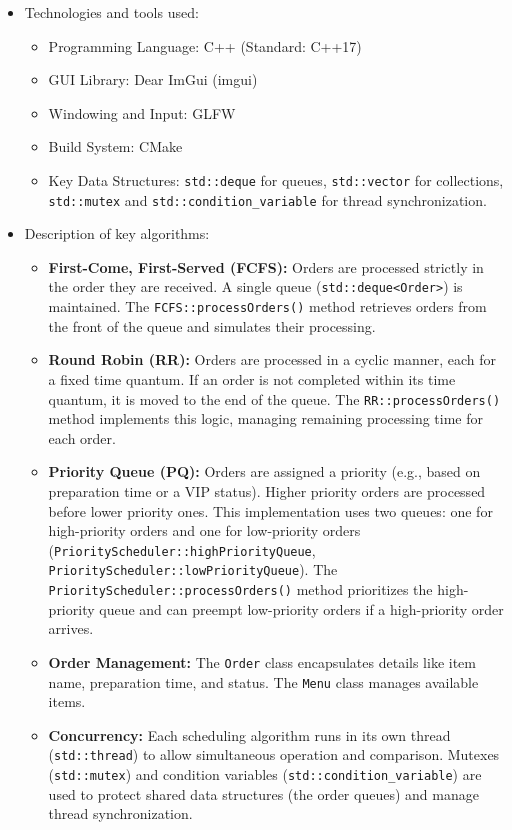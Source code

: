 \documentclass[a4paper,12pt]{article}
\begin{document}
\begin{itemize}
\begin{itemize}
        \end{itemize}
    \item Technologies and tools used:
        \begin{itemize}
            \item Programming Language: C++ (Standard: C++17)
            \item GUI Library: Dear ImGui (imgui)
            \item Windowing and Input: GLFW
            \item Build System: CMake
            \item Key Data Structures: \nolinkurl{std::deque} for queues, \nolinkurl{std::vector} for collections, \nolinkurl{std::mutex} and \nolinkurl{std::condition_variable} for thread synchronization.
        \end{itemize}
    \item Description of key algorithms:
        \begin{itemize}
            \item \textbf{First-Come, First-Served (FCFS):} Orders are processed strictly in the order they are received. A single queue (\nolinkurl{std::deque<Order>}) is maintained. The \nolinkurl{FCFS::processOrders()} method retrieves orders from the front of the queue and simulates their processing.
            \item \textbf{Round Robin (RR):} Orders are processed in a cyclic manner, each for a fixed time quantum. If an order is not completed within its time quantum, it is moved to the end of the queue. The \nolinkurl{RR::processOrders()} method implements this logic, managing remaining processing time for each order.
            \item \textbf{Priority Queue (PQ):} Orders are assigned a priority (e.g., based on preparation time or a VIP status). Higher priority orders are processed before lower priority ones. This implementation uses two queues: one for high-priority orders and one for low-priority orders (\nolinkurl{PriorityScheduler::highPriorityQueue}, \nolinkurl{PriorityScheduler::lowPriorityQueue}). The \nolinkurl{PriorityScheduler::processOrders()} method prioritizes the high-priority queue and can preempt low-priority orders if a high-priority order arrives.
            \item \textbf{Order Management:} The \nolinkurl{Order} class encapsulates details like item name, preparation time, and status. The \nolinkurl{Menu} class manages available items.
            \item \textbf{Concurrency:} Each scheduling algorithm runs in its own thread (\nolinkurl{std::thread}) to allow simultaneous operation and comparison. Mutexes (\nolinkurl{std::mutex}) and condition variables (\nolinkurl{std::condition_variable}) are used to protect shared data structures (the order queues) and manage thread synchronization.
        \end{itemize}
\end{itemize}
\newpage
\end{document}
